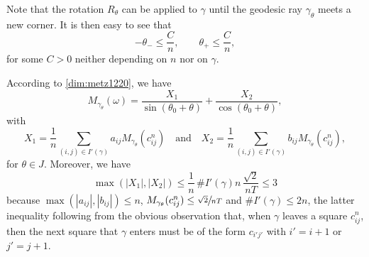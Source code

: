 \documentclass[JEP,XML,SOM,Unicode, NoEqCountersInSection,NoFloatCountersInSection,published]{cedram}
\theoremstyle{definition}
\begin{document}
Note that the rotation $R_\theta$ can be applied to $\gamma$ until the geodesic ray $\gamma_\theta$ meets a new corner. It is then easy to see that
\begin{equation} \label{thetapm}
-\theta_- \leq \frac{C}{n}, \qquad\theta_+ \leq \frac{C}{n},
\end{equation}
for some $C>0$ neither depending on $n$ nor on $\gamma$.

According to \eqref{dim:metz1220}, we have
\begin{equation}\label{metz:2248}
M_{\gamma_\theta }(\omega)=\frac{X_1}{\sin (\theta_0+\theta)}+\frac{X_2}{\cos (\theta_0+\theta)},
\end{equation}
with
\[
X_1=\frac{1}{n}\sum_{(i,j)\in I'(\gamma)}a_{ij} M_{\gamma_\theta}(c_{ij}^n)\quad \text{and}\quad X_2=\frac{1}{n}\sum_{(i,j)\in I'(\gamma)}b_{ij} M_{\gamma_\theta}(c_{ij}^n),
\]
for $\theta\in J$.
Moreover, we have
{
\[
\max (|X_1|,|X_2|)\leq \frac{1}{n}\,\# I'(\gamma)n\,\frac{\sqrt{2}}{nT}\leq 3
\]
because $\max (|a_{ij}|,|b_{ij}|) \leq n$, $M_{\gamma_\theta}(c_{ij}^n)\leq \sfrac{\sqrt{2}}{nT}$ and $\# I'(\gamma)\leq 2n$, the latter inequality following from the obvious observation that, when $\gamma$ leaves a square $c_{ij}^n$, then the next square that $\gamma$ enters must be of the form $c_{i'j'}$ with $i'=i+1$ or $j'=j+1$.
}
\end{document}
